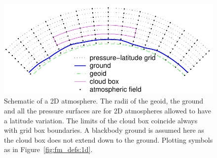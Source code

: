  \begin{figure}[!t]
  \begin{center}
   \includegraphics*[width=0.95\hsize]{Figs/fm_definitions/atm_dim_2d}
   \caption{ Schematic of a 2D atmosphere. The radii of the geoid, the ground
     and all the pressure surfaces are for 2D atmospheres allowed to
     have a latitude variation. The limits of the cloud box coincide
     always with grid box boundaries. A blackbody ground is assumed
     here as the cloud box does not extend down to the ground.
     Plotting symbols as in Figure~\ref{fig:fm_defs:1d}. }
   \label{fig:fm_defs:2d}
  \end{center}
 \end{figure}


\label{sec:fm_defs:altitudes}

